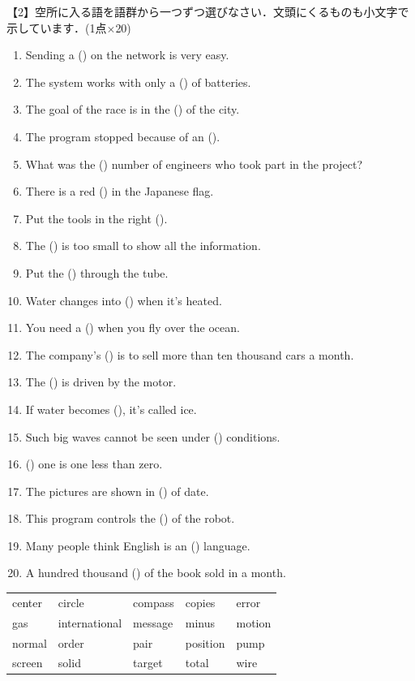 \noindent 【2】空所に入る語を語群から一つずつ選びなさい．文頭にくるものも小文字で示しています．(1点$\times$20)
\begin{enumerate}
  \item Sending a (\quad\quad) on the network is very easy. 
  \item The system works with only a (\quad\quad) of batteries.
  \item The goal of the race is in the (\quad\quad) of the city. 
  \item The program stopped because of an (\quad\quad).
  \item What was the (\quad\quad) number of engineers who took part in the project? 
  \item There is a red (\quad\quad) in the Japanese flag. 
  \item Put the tools in the right (\quad\quad). 
  \item The (\quad\quad) is too small to show all the information. 
  \item Put the (\quad\quad) through the tube. 
  \item Water changes into (\quad\quad) when it's heated. 
  \item You need a (\quad\quad) when you fly over the ocean. 
  \item The company's (\quad\quad) is to sell more than ten thousand cars a month. 
  \item The (\quad\quad) is driven by the motor. 
  \item If water becomes (\quad\quad), it's called ice. 
  \item Such big waves cannot be seen under (\quad\quad) conditions. 
  \item (\quad\quad) one is one less than zero. 
  \item The pictures are shown in (\quad\quad) of date. 
  \item This program controls the (\quad\quad) of the robot. 
  \item Many people think English is an (\quad\quad) language. 
  \item A hundred thousand (\quad\quad) of the book sold in a month. 
\end{enumerate}
\medskip
\begin{tabular}{|l l l l l|}
  \hline
  center&circle&compass&copies&error\\
  gas&international&message&minus&motion\\
  normal&order&pair&position&pump\\
  screen&solid&target&total&wire\\ 
  \hline
\end{tabular}
\bigskip\bigskip

